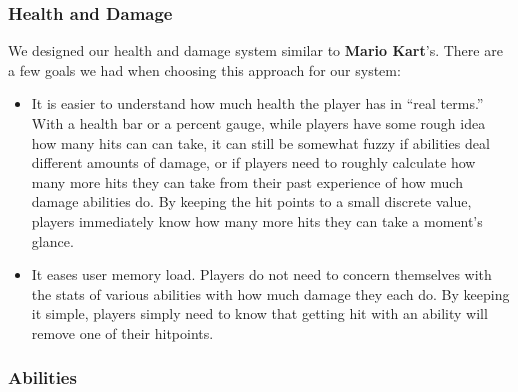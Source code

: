 \documentclass{article}
\theoremstyle{definition}
\begin{document}
\subsubsection{Health and Damage}

We designed our health and damage system similar to \textbf{Mario Kart}'s.
There are a few goals we had when choosing this approach for our system:
\begin{itemize}
  \item It is easier to understand how much health the player has in ``real
    terms.'' With a health bar or a percent gauge, while players have some
    rough idea how many hits can can take, it can still be somewhat fuzzy if
    abilities deal different amounts of damage, or if players need to roughly
    calculate how many more hits they can take from their past experience of
    how much damage abilities do. By keeping the hit points to a small discrete
    value, players immediately know how many more hits they can take a moment's
    glance.
  \item It eases user memory load. Players do not need to concern themselves
    with the stats of various abilities with how much damage they each do. By
    keeping it simple, players simply need to know that getting hit with an
    ability will remove one of their hitpoints.
\end{itemize}

\subsubsection{Abilities}
\end{document}
